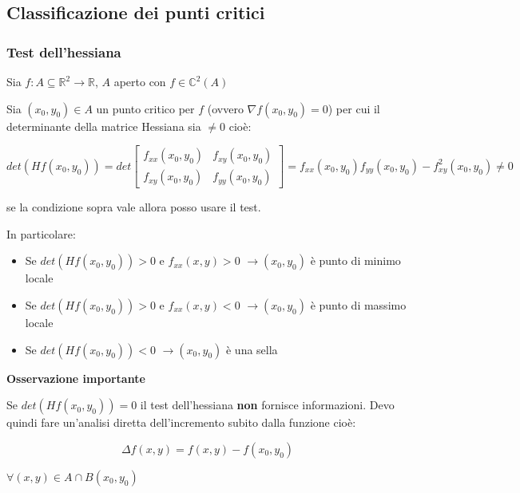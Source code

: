 \documentclass[../appunti-analisi.tex]{subfiles}
\begin{document}
\newpage


\subsection{Classificazione dei punti critici}

\subsubsection{Test dell'hessiana}

Sia $f: A \subseteq \mathbb{R}^{2} \rightarrow \mathbb{R}$, $A$ aperto con $f \in \mathbb{C}^{2}(A)$

Sia $(x_0,y_0) \in A$ un punto critico per $f$ (ovvero $\nabla f(x_0,y_0) = 0$) per cui il determinante della matrice Hessiana sia $\neq 0$ cioè:

\[
    det (Hf(x_0,y_0)) = det \begin{bmatrix}
    f_{xx}(x_0,y_0) & f_{xy}(x_0,y_0)\\
    f_{xy}(x_0,y_0) & f_{yy}(x_0,y_0)  
    \end{bmatrix} = f_{xx}(x_0,y_0) f_{yy}(x_0,y_0) - f_{xy}^{2}(x_0,y_0) \neq 0
\]

se la condizione sopra vale allora posso usare il test.

In particolare:

\begin{itemize}
    \item Se $det(Hf(x_0,y_0))>0$ e $f_{xx}(x,y)>0$  $\rightarrow (x_0,y_0)$ è punto di minimo locale
    \item Se $det(Hf(x_0,y_0))>0$ e $f_{xx}(x,y)<0$  $\rightarrow (x_0,y_0)$ è punto di massimo locale
    \item Se $det(Hf(x_0,y_0))<0$ $\rightarrow (x_0,y_0)$ è una sella
\end{itemize}

\textbf{Osservazione importante} 

Se $det(Hf(x_0,y_0)) =0$ il test dell'hessiana \textbf{non} fornisce informazioni. Devo quindi fare un'analisi diretta dell'incremento subito dalla funzione cioè:

\[
  \Delta f(x,y) = f(x,y)-f(x_0,y_0)
\]

$\forall (x,y) \in A \cap B(x_0,y_0)$
\end{document}
